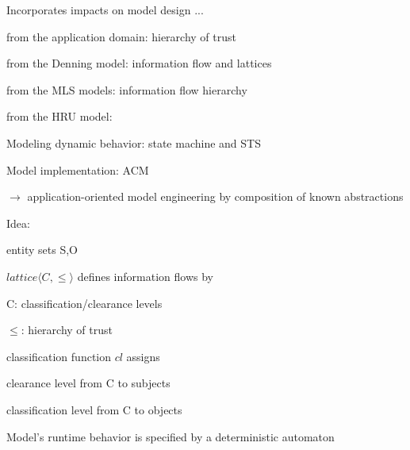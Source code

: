 \documentclass[a4paper]{article}
\begin{document}
\begin{multicols}{3}
    Incorporates impacts on model design ...
    \begin{itemize*}
        \item from the application domain: hierarchy of trust
        \item from the Denning model: information flow and lattices
        \item from the MLS models: information flow hierarchy
        \item from the HRU model:
        \begin{itemize*}
            \item Modeling dynamic behavior: state machine and STS
            \item Model implementation: ACM
        \end{itemize*}
        \item $\rightarrow$ application-oriented model engineering by composition of known abstractions
    \end{itemize*}

    Idea:
    \begin{itemize*}
        \item entity sets S,O
        \item $lattice⟨C,\leq⟩$ defines information flows by
        \begin{itemize*}
            \item C: classification/clearance levels
            \item $\leq$: hierarchy of trust
        \end{itemize*}
        \item classification function $cl$ assigns
        \begin{itemize*}
            \item clearance level from C to subjects
            \item classification level from C to objects
        \end{itemize*}
        \item Model’s runtime behavior is specified by a deterministic automaton
    \end{itemize*}


\end{multicols}
\end{document}
